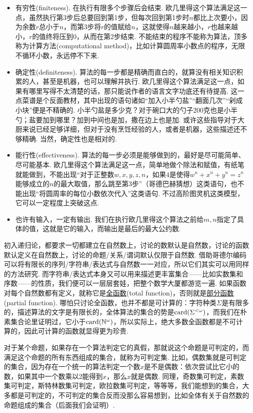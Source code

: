 \begin{itemize}
    \item 有穷性(finiteness). 在执行有限多个步骤后会结束. 欧几里得这个算法满足这一点，虽然执行第3步后总要回到第1步，但每次回到第1步时\(n\)都比上次要小，因为余数\(r\)总小于\(n\)，而第3步将\(r\)的值赋给\(n\)，这就使得\(n\)越来越小，\(r\)也越来越小，\(r\)的值终将压到\(0\)，从而在第2步结束. 不能结束的程序不能称为算法，顶多称为计算方法(computational method)，比如计算圆周率小数点的程序，无限不循环小数，永远停不下来.
    \item 确定性(definiteness). 算法的每一步都是精确而直白的，就算没有相关知识积累的人，甚至是机器，也可以理解并执行. 欧几里得这个算法满足这一点，如果有哪里写得不太清楚的话，那只能说作者的语言文字功底还有待提高. 这一点菜谱是个反面教材，其中出现的语句诸如“加入小半勺盐”“翻面几次”“剁成小块”便是不精确的. 小半勺盐是多少克？对于碗口大的勺子200克也是小半勺；盐要加到哪里？加到中间也是加，撒在边上也是加. 或许这些指导对于大厨来说已经足够详细，但对于没有烹饪经验的人，或者是机器，这些描述还不够精确. 当然，确定性也是相对的.
    \item 能行性(effectiveness). 算法的每一步必须是能够做到的，最好是尽可能简单、尽可能基本. 欧几里得这个算法满足这一点，简单地做个除法和赋值，有纸笔就能做到，不能出现“对于正整数\(w,x,y,z,n\)，如果\(4\)是使得\(w^n+x^n+y^n=z^n\)能够成立的\(n\)的最大取值，那么跳至第3步”（哥德巴赫猜想）这类语句，也不能出现“将圆周率的每位小数依次代入”这类语句. 不过高阶图灵机这类模型，它可以一定程度上突破这点.
    \item 也许有输入，一定有输出. 我们在执行欧几里得这个算法之前给\(m,n\)指定了具体的值，这就是它的输入，而输出是最后的最大公约数.
\end{itemize}

初入递归论，都要求一切都建立在自然数上，讨论的数默认是自然数，讨论的函数默认定义在自然数上，讨论的命题/关系/谓词默认仅限于自然数. 借助哥德尔编码可以将有限长的序列/字符串/表达式与自然数一一对应，所以它们其实可以用同样的方法研究. 而字符串/表达式本身又可以用来描述更丰富集合——比如实数集和序数——的性质，我们便可以一层层套娃，把整个数学大厦都游览一遍. 如果函数对每个自然数都有定义，就称它是\underline{全函数}(total function)，否则就是\underline{部分函数}(partial function). 哪怕只讨论全函数，也并不都是可计算的：字符种类\(\Sigma\)是有限多的，描述算法的文字是有限长的，全体算法的集合的势是\({\rm card}(\Sigma^{<\omega})\)，而我们在朴素集合论里证明过，它小于\({\rm card}(\mathbb{N}^\omega)\)，所以实际上，绝大多数全函数都是不可计算的，因此可计算的函数就显得更为珍贵.

对于某个命题，如果存在一个算法判定它的真假，那就说这个命题是可判定的，而满足这个命题的所有东西组成的集合，就称为可判定集. 比如，偶数集就是可判定的集合，因为存在一个统一的算法判定一个数\(x\)是不是偶数：依次尝试比它小的数，如果其中一个数乘以2能得到\(x\)，那么\(x\)就是偶数. 同理，奇数集可判定，素数集可判定，斯特林数集可判定，欧拉数集可判定，等等等，我们能想到的集合，大多都是可判定的，不可判定的集合反而没那么容易想到，比如全体有关于自然数的命题组成的集合（后面我们会证明）.

